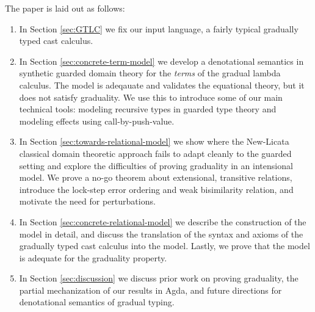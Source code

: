 The paper is laid out as follows:
\begin{enumerate}
\item In Section \ref{sec:GTLC} we fix our input language, a fairly
  typical gradually typed cast calculus.
\item In Section \ref{sec:concrete-term-model} we develop a
  denotational semantics in synthetic guarded domain theory for the
  \emph{terms} of the gradual lambda calculus.  The model is adeqauate
  and validates the equational theory, but it does not satisfy
  graduality. We use this to introduce some of our main technical
  tools: modeling recursive types in guarded type theory and modeling
  effects using call-by-push-value.
\item In Section \ref{sec:towards-relational-model} we show where the New-Licata
  classical domain theoretic approach fails to adapt cleanly to the guarded
  setting and explore the difficulties of proving graduality in an intensional
  model. We prove a no-go theorem about extensional, transitive relations,
  introduce the lock-step error ordering and weak bisimilarity relation, and
  motivate the need for perturbations.
\item In Section \ref{sec:concrete-relational-model} we describe the
  construction of the model in detail, and discuss the
  translation of the syntax and axioms of the gradually typed cast calculus into the model.
  Lastly, we prove that the model is adequate for the graduality property.
\item In Section \ref{sec:discussion} we discuss prior work on proving
  graduality, the partial mechanization of our results in Agda, and
  future directions for denotational semantics of gradual typing.
\end{enumerate}
